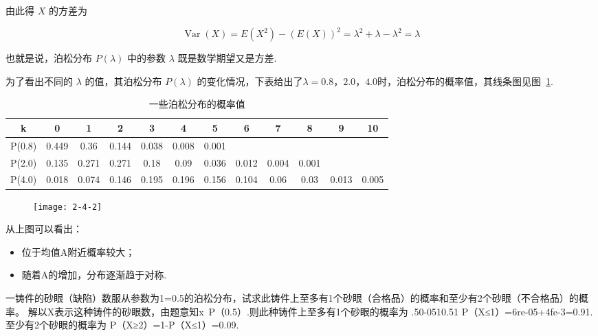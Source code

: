 由此得 $ X $ 的方差为

\[
\operatorname{Var}(X)=E\left(X^{2}\right)-(E(X))^{2}=\lambda^{2}+\lambda-\lambda^{2}=\lambda
\]

也就是说，泊松分布 $P(\lambda)$ 中的参数 $\lambda$ 既是数学期望又是方差.

为了看出不同的 $\lambda$ 的值，其泊松分布 $P(\lambda)$ 的变化情况，下表给出了$ \lambda =
0.8，2.0，4.0 $时，泊松分布的概率值，其线条图见图~\ref{fig:2-4-2}.

\begin{table}[htbp]
	\centering
	\caption{一些泊松分布的概率值}
	\begin{tabular}{c|ccccccccccc}
		\toprule
		k     & 0     & 1     & 2     & 3     & 4     & 5     & 6     & 7     & 8     & 9     & 10 \\\midrule
		P(0.8) & 0.449 & 0.36  & 0.144 & 0.038 & 0.008 & 0.001 &       &       &       &       &  \\
		P(2.0) & 0.135 & 0.271 & 0.271 & 0.18  & 0.09  & 0.036 & 0.012 & 0.004 & 0.001 &       &  \\
		P(4.0) & 0.018 & 0.074 & 0.146 & 0.195 & 0.196 & 0.156 & 0.104 & 0.06  & 0.03  & 0.013 & 0.005 \\\bottomrule
	\end{tabular}%
	\label{tab:2.4.2}%
\end{table}%

\begin{figure}
	\centering
	\texttt{[image: 2-4-2]}
	\caption{}
	\label{fig:2-4-2}
\end{figure}

从上图可以看出：

\begin{itemize}
	\item 位于均值A附近概率较大；
	\item 随着A的增加，分布逐渐趋于对称.
\end{itemize}

\begin{example}
	一铸件的砂眼（缺陷）数服从参数为1=0.5的泊松分布，试求此铸件上至多有1个砂眼（合格品）的概率和至少有2个砂眼（不合格品）的概率。
	解以X表示这种铸件的砂眼数，由题意知x~P（0.5）.则此种铸件上至多有1个砂眼的概率为
	.50-0510.51
	P（X≤1）=6re-05+4fe-3=0.91.
	至少有2个砂眼的概率为
	P（X≥2）=1-P（X≤1）=0.09.
\end{example}

